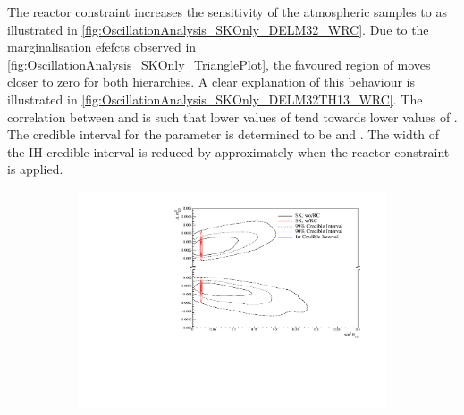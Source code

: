 The reactor constraint increases the sensitivity of the atmospheric samples to \delmsqatm as illustrated in \autoref{fig:OscillationAnalysis_SKOnly_DELM32_WRC}. Due to the marginalisation efefcts observed in \autoref{fig:OscillationAnalysis_SKOnly_TrianglePlot}, the favoured region of \delmsqatm moves closer to zero for both hierarchies. A clear explanation of this behaviour is illustrated in \autoref{fig:OscillationAnalysis_SKOnly_DELM32TH13_WRC}. The correlation between \delmsqatm and \sinsqreac is such that lower values of \sinsqreac tend towards lower values of . The \quickmath{1\sigma} credible interval for the \delmsqatm parameter is determined to be  and . The width of the IH credible interval is reduced by approximately  when the reactor constraint is applied.

\begin{figure}[h]
  \begin{subfigure}[t]{1.0\textwidth}
    \includegraphics[width=\textwidth, trim={0mm 0mm 0mm 0mm}, clip,page=1]{Figures/OA/SKOnlyFit_wRC/ContourComparison_2D_th13_dm32_BH_0_wRC_woRC_UnSmeared_CredibleInterval.pdf}
  \end{subfigure}
  \caption{}
  \label{fig:OscillationAnalysis_SKOnly_DELM32TH13_WRC}
\end{figure}

